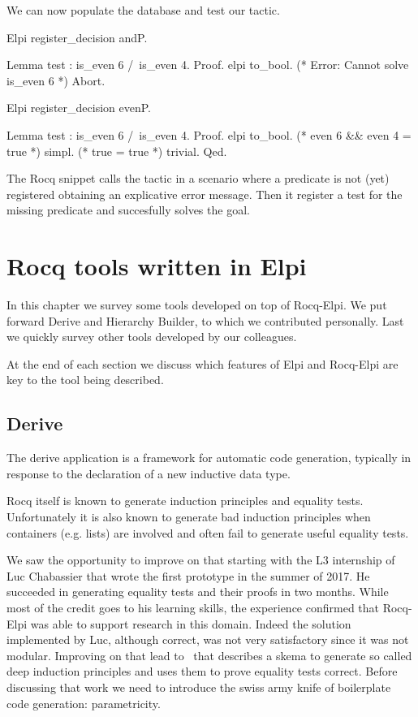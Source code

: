 \documentclass[a4paper, 11pt]{book}
\begin{document}
We can now populate the database and test our tactic.

\begin{rocqcode}
Elpi register_decision andP.

Lemma test : is_even 6 /\ is_even 4.
Proof.
elpi to_bool. (* Error: Cannot solve is_even 6 *)
Abort.

Elpi register_decision evenP.

Lemma test : is_even 6 /\ is_even 4.
Proof.
elpi to_bool. (* even 6 && even 4 = true *)
simpl.        (* true = true *)
trivial.
Qed.
\end{rocqcode}
  
The Rocq snippet calls the  tactic in a scenario
where a predicate is not (yet) registered obtaining an explicative
error message. Then it register a test for the missing predicate
and succesfully solves the goal.


\chapter{Rocq tools written in Elpi}

In this chapter we survey some tools developed on top of Rocq-Elpi.
We put forward Derive and Hierarchy Builder, to which we contributed personally.
Last we quickly survey other tools developed by our colleagues.

At the end of each section we discuss which features of Elpi and Rocq-Elpi
are key to the tool being described.

\section{Derive}\label{sec:derive}

The derive application is a framework for automatic
code generation, typically in response to the declaration of a new inductive
data type.

Rocq itself is known to generate induction principles and equality tests.
Unfortunately it is also known to generate bad induction principles when
containers (e.g. lists) are involved and often fail to generate useful
equality tests.

We saw the opportunity to improve on that starting with the L3 internship of
Luc Chabassier that wrote the first prototype in the summer of 2017.
He succeeded in generating
equality tests and their proofs in two months. While most of the credit goes to
his learning skills, the experience confirmed that Rocq-Elpi was able to support
research in this domain. Indeed the solution implemented by Luc, although
correct, was not very satisfactory since it was not modular. Improving
on that lead to~\cite{tassi:hal-01897468} that describes a skema to
generate so called deep induction principles and uses them to prove
equality tests correct. Before discussing that work we need to introduce
the swiss army knife of boilerplate code generation: parametricity.
\end{document}
